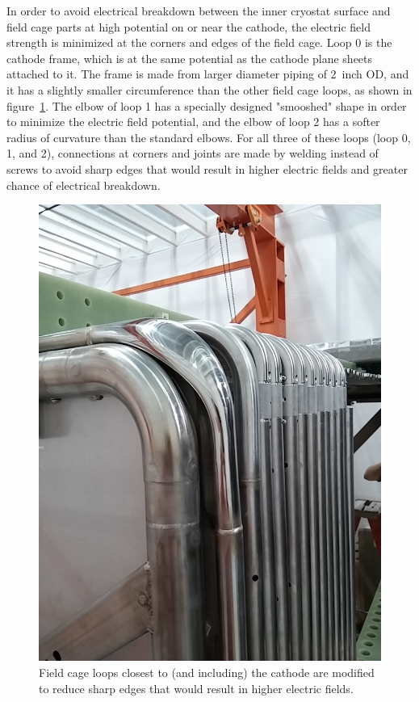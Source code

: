 In order to avoid electrical breakdown between the inner cryostat surface and field cage parts at high potential on or near the cathode, the electric field strength is minimized at the corners and edges of the field cage. Loop 0 is the cathode frame, which is at the same potential as the cathode plane sheets attached to it. The frame is made from larger diameter piping of 2~inch OD, and it has a slightly smaller circumference than the other field cage loops, as shown in figure~\ref{fig:tpc-smooshed-elbow}. The elbow of loop 1 has a specially designed "smooshed" shape in order to minimize the electric field potential, and the elbow of loop 2 has a softer radius of curvature than the standard elbows. For all three of these loops (loop 0, 1, and 2), connections at corners and joints are made by welding instead of screws to avoid sharp edges that would result in higher electric fields and greater chance of electrical breakdown.

\begin{figure}[htb]
\centering	
\includegraphics[width=0.8\linewidth]{figures/tpc-smooshed-elbow-3.jpg}
\caption{Field cage loops closest to (and including) the cathode are modified to reduce sharp edges that would result in higher electric fields.}
\label{fig:tpc-smooshed-elbow}
\end{figure}

